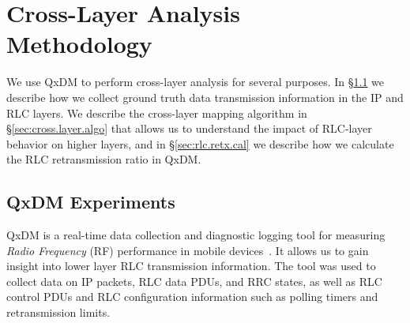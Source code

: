\section{Cross-Layer Analysis\\Methodology}\label{sec:qxdmresults}

We use QxDM to perform cross-layer analysis for several purposes.  In \S\ref{sec:exp.setup} we describe how we collect ground truth data transmission information in the IP and RLC layers.  We describe the cross-layer mapping algorithm in \S\ref{sec:cross.layer.algo} that allows us to understand the impact of RLC-layer behavior on higher layers, and in \S\ref{sec:rlc.retx.cal} we describe how we calculate the RLC retransmission ratio in QxDM.


\subsection{QxDM Experiments}\label{sec:exp.setup}

QxDM is a real-time data collection and diagnostic logging tool for measuring \textit{Radio Frequency} (RF) performance in mobile devices~\cite{qxdm_flyer}. It allows us to gain insight into lower layer RLC transmission information.  
The tool was used to collect data on IP packets, RLC data PDUs, and RRC states, as well as RLC control PDUs and RLC configuration information such as polling timers and retransmission limits.  

